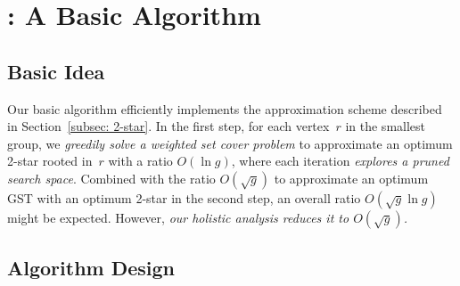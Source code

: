\section{\Basic: A Basic Algorithm}
\label{sec: basic}

\subsection{Basic Idea}

Our basic algorithm \Basic efficiently implements the approximation scheme described in Section~\ref{subsec: 2-star}. In the first step, for each vertex~$r$ in the smallest group, we \emph{greedily solve a weighted set cover problem} to approximate an optimum 2-star rooted in~$r$ with a ratio $O(\ln{g})$, where each iteration \emph{explores a pruned search space}. Combined with the ratio $O(\sqrt{g})$ to approximate an optimum GST with an optimum 2-star in the second step, an overall ratio $O(\sqrt{g}\ln g)$ might be expected. However, \emph{our holistic analysis reduces it to $O(\sqrt{g})$.}

\subsection{Algorithm Design}
\label{subsec: basic_design}


